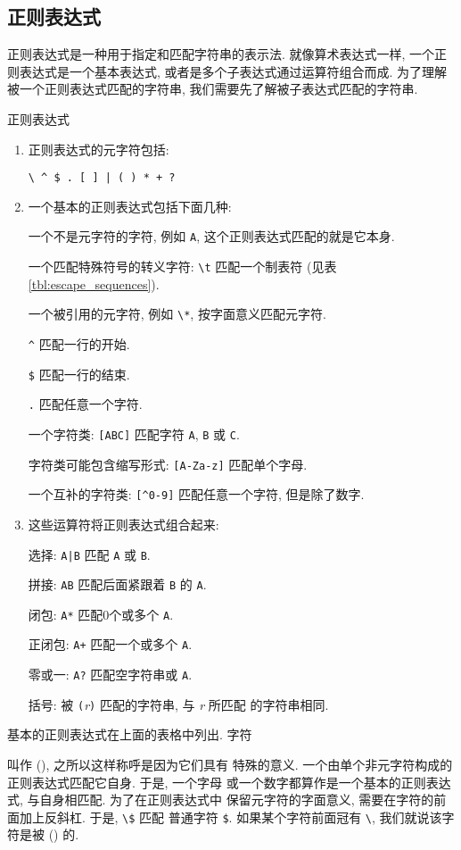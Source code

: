 \subsection{正则表达式}
\label{subsec:regular_expressions}
正则表达式是一种用于指定和匹配字符串的表示法. 就像算术表达式一样,
一个正则表达式是一个基本表达式, 或者是多个子表达式通过运算符组合而成.
为了理解被一个正则表达式匹配的字符串, 我们需要先了解被子表达式匹配的字符串.
\begin{summary}{正则表达式}
\begin{enumerate}
\item 正则表达式的元字符包括: \par
    \verb'\ ^ $ . [ ] | ( ) * + ?'
\item 一个基本的正则表达式包括下面几种: \par
    一个不是元字符的字符, 例如 \verb'A', 这个正则表达式匹配的就是它本身. \par
    一个匹配特殊符号的转义字符: \verb'\t' 匹配一个制表符 (见表
    \ref{tbl:escape_sequences}). \par
    一个被引用的元字符, 例如 \verb'\*', 按字面意义匹配元字符. \par
    \verb'^' 匹配一行的开始. \par
    \verb'$' 匹配一行的结束. \par
    \verb'.' 匹配任意一个字符. \par
    一个字符类: \verb'[ABC]' 匹配字符 \verb'A', \verb'B' 或 \verb'C'. \par
    字符类可能包含缩写形式: \verb'[A-Za-z]' 匹配单个字母. \par
    一个互补的字符类: \verb'[^0-9]' 匹配任意一个字符, 但是除了数字.
\item 这些运算符将正则表达式组合起来:   \par
    选择: \verb'A|B' 匹配 \verb'A' 或 \verb'B'. \par
    拼接: \verb'AB' 匹配后面紧跟着 \verb'B' 的 \verb'A'. \par
    闭包: \verb'A*' 匹配0个或多个 \verb'A'. \par
    正闭包: \verb'A+' 匹配一个或多个 \verb'A'. \par
    零或一: \verb'A?' 匹配空字符串或 \verb'A'. \par
    括号: 被 \verb'('\textit{r}\verb')' 匹配的字符串, 与 \textit{r} 所匹配 
    的字符串相同.
\end{enumerate}
\end{summary}

基本的正则表达式在上面的表格中列出. 字符
叫作  (), 之所以这样称呼是因为它们具有
特殊的意义. 一个由单个非元字符构成的正则表达式匹配它自身. 于是, 一个字母
或一个数字都算作是一个基本的正则表达式, 与自身相匹配.  为了在正则表达式中
保留元字符的字面意义, 需要在字符的前面加上反斜杠. 于是, \verb'\$' 匹配
普通字符 \verb'$'. 如果某个字符前面冠有 \verb'\', 我们就说该字符是被
 () 的.

